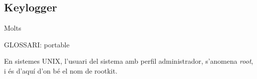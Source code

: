 \subsection{Keylogger}
Molts












GLOSSARI: portable


En sistemes UNIX, l'usuari del sistema amb perfil administrador, s'anomena \emph{root}, i és d'aquí d'on bé 
el nom de rootkit.


